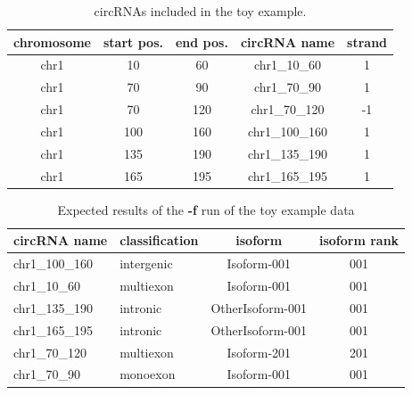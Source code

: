 \documentclass[letterpaper,12pt]{article}
\begin{document}
\begin{table}[h]
    \centering
    \begin{tabular}{c c c c c }
        chromosome & start pos. & end pos. & circRNA name & strand \\
        \hline\hline
        chr1 & 10 & 60 & chr1\_10\_60 & 1 \\
        chr1 & 70 & 90 & chr1\_70\_90 & 1 \\
        chr1 & 70 & 120 & chr1\_70\_120 & -1 \\
        chr1 & 100 & 160 & chr1\_100\_160 & 1 \\
        chr1 & 135 & 190 & chr1\_135\_190 & 1 \\
        chr1 & 165 & 195 & chr1\_165\_195 & 1 \\
    \end{tabular}
    \caption{circRNAs included in the toy example.}
    \label{tab:toy_circrna}
\end{table}

\begin{table}[h]
    \centering
    \begin{tabular}{l l c c}
        circRNA name & classification & isoform & isoform rank \\
        \hline\hline
        chr1\_100\_160 & intergenic & Isoform-001 & 001 \\
        chr1\_10\_60 & multiexon & Isoform-001 & 001 \\
        chr1\_135\_190 & intronic & OtherIsoform-001 & 001 \\
        chr1\_165\_195 & intronic & OtherIsoform-001 & 001 \\
        chr1\_70\_120 & multiexon & Isoform-201 & 201 \\
        chr1\_70\_90 & monoexon & Isoform-001 & 001 \\
    \end{tabular}
    \caption{Expected results of the \textbf{-f} run of the toy example data}
    \label{tab:toy_results}
\end{table}
\end{document}
